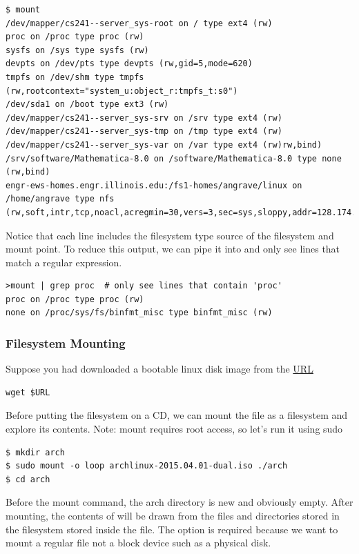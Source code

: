 \begin{verbatim}
$ mount
/dev/mapper/cs241--server_sys-root on / type ext4 (rw)
proc on /proc type proc (rw)
sysfs on /sys type sysfs (rw)
devpts on /dev/pts type devpts (rw,gid=5,mode=620)
tmpfs on /dev/shm type tmpfs (rw,rootcontext="system_u:object_r:tmpfs_t:s0")
/dev/sda1 on /boot type ext3 (rw)
/dev/mapper/cs241--server_sys-srv on /srv type ext4 (rw)
/dev/mapper/cs241--server_sys-tmp on /tmp type ext4 (rw)
/dev/mapper/cs241--server_sys-var on /var type ext4 (rw)rw,bind)
/srv/software/Mathematica-8.0 on /software/Mathematica-8.0 type none (rw,bind)
engr-ews-homes.engr.illinois.edu:/fs1-homes/angrave/linux on /home/angrave type nfs (rw,soft,intr,tcp,noacl,acregmin=30,vers=3,sec=sys,sloppy,addr=128.174.252.102)
\end{verbatim}

Notice that each line includes the filesystem type source of the filesystem and mount point.
To reduce this output, we can pipe it into  and only see lines that match a regular expression.

\begin{verbatim}
>mount | grep proc  # only see lines that contain 'proc'
proc on /proc type proc (rw)
none on /proc/sys/fs/binfmt_misc type binfmt_misc (rw)
\end{verbatim}

\subsubsection{Filesystem Mounting}

Suppose you had downloaded a bootable linux disk image from the \href{http://cosmos.cites.illinois.edu/pub/archlinux/iso/2015.04.01/archlinux-2015.04.01-dual.iso}{URL}

\begin{verbatim}
wget $URL
\end{verbatim}

Before putting the filesystem on a CD, we can mount the file as a filesystem and explore its contents.
Note: mount requires root access, so let's run it using sudo

\begin{verbatim}
$ mkdir arch
$ sudo mount -o loop archlinux-2015.04.01-dual.iso ./arch
$ cd arch
\end{verbatim}

Before the mount command, the arch directory is new and obviously empty.
After mounting, the contents of  will be drawn from the files and directories stored in the filesystem stored inside the  file.
The  option is required because we want to mount a regular file not a block device such as a physical disk.

